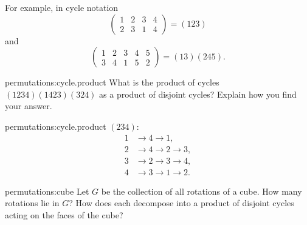 For example, in cycle notation
\[
\begin{pmatrix}
1 & 2 & 3 & 4 \\
2 & 3 & 1 & 4
\end{pmatrix}
=(1 2 3)
\]
and
\[
\begin{pmatrix}
1 & 2 & 3 & 4 & 5 \\
3 & 4 & 1 & 5 & 2 
\end{pmatrix}
=(1 3)(2 4 5).
\]
\begin{problem}{permutations:cycle.product}
What is the product of cycles \((1234)(1423)(324)\) as a product of disjoint cycles?
Explain how you find your answer.
\end{problem}
\begin{answer}{permutations:cycle.product}
\((234)\): 
\begin{align*}
1 &\to 4 \to 1, \\
2 &\to 4 \to 2 \to 3, \\
3 &\to 2 \to 3 \to 4, \\
4 &\to 3 \to 1 \to 2.
\end{align*}
\end{answer}
\begin{problem}{permutations:cube}
Let \(G\) be the collection of all rotations of a cube.
How many rotations lie in \(G\)?
How does each decompose into a product of disjoint cycles acting on the faces of the cube?
\end{problem}
